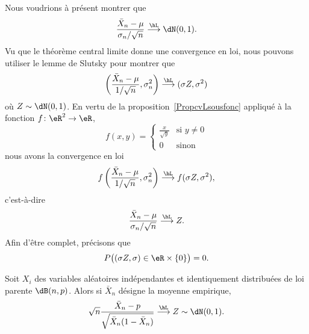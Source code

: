 \begin{example}
	Nous voudrions à présent montrer que
	\begin{equation}
		\frac{ \bar X_n-\mu }{ \sigma_n/\sqrt{n} }\stackrel{\hL}{\longrightarrow}\dN(0,1).
	\end{equation}
	Vu que le théorème central limite donne une convergence en loi, nous pouvons utiliser le lemme de Slutsky pour montrer que
	\begin{equation}
		\left( \frac{ \bar X_n-\mu }{ 1/\sqrt{n} },\sigma_n^2 \right)\stackrel{\hL}{\longrightarrow}(\sigma Z,\sigma^2)
	\end{equation}
	où \( Z\sim\dN(0,1)\). En vertu de la proposition~\ref{PropcvLsousfonc} appliqué à la fonction \( f\colon \eR^2\to \eR\),
	\begin{equation}
		f(x,y)=\begin{cases}
			\frac{ x }{ \sqrt{y} } & \text{si } y\neq 0 \\
			0                      & \text{sinon}
		\end{cases}
	\end{equation}
	nous avons la convergence en loi
	\begin{equation}
		f\left( \frac{ \bar X_n-\mu }{ 1/\sqrt{n} },\sigma_n^2 \right)\stackrel{\hL}{\longrightarrow}f(\sigma Z,\sigma^2),
	\end{equation}
	c'est-à-dire
	\begin{equation}
		\frac{ \bar X_n-\mu }{ \sigma_n/\sqrt{n} }\stackrel{\hL}{\longrightarrow}Z.
	\end{equation}
	Afin d'être complet, précisons que
	\begin{equation}
		P\big( (\sigma Z,\sigma)\in\eR\times \{ 0 \} \big)=0.
	\end{equation}
\end{example}

\begin{proposition}     \label{PropLimxBNpxbxbsqrt}
	Soit \( X_i\) des variables aléatoires indépendantes et identiquement distribuées de loi parente \( \dB(n,p)\). Alors si \( \bar X_n\) désigne la moyenne empirique,
	\begin{equation}
		\sqrt{n}\frac{ \bar X_n-p }{ \sqrt{\bar X_n(1-\bar X_n)} }\stackrel{\hL}{\longrightarrow}Z\sim\dN(0,1).
	\end{equation}
\end{proposition}

